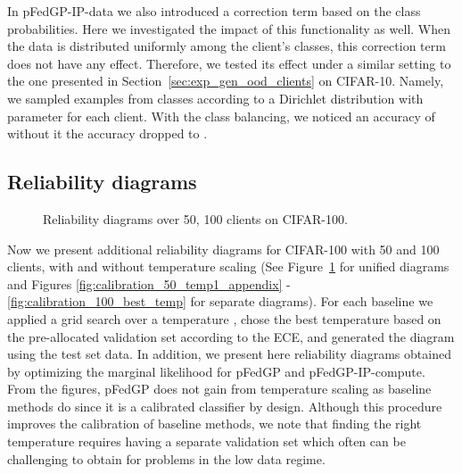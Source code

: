 \documentclass{article}
\def\Figref#1{Figure~\ref{#1}}
\def\Secref#1{Section~\ref{#1}}
\begin{document}
In pFedGP-IP-data we also introduced a correction term based on the class probabilities. Here we investigated the impact of this functionality as well.
When the data is distributed uniformly among the client's classes, this correction term does not have any effect. Therefore, we tested its effect under a similar setting to the one presented in \Secref{sec:exp_gen_ood_clients} on CIFAR-10. Namely, we sampled examples from classes according to a Dirichlet distribution with parameter  for each client. With the class balancing, we noticed an accuracy of  without it the accuracy dropped to .

\subsection{Reliability diagrams} \label{sec:reliability_diad_appendix}
\begin{figure}[!t]
\centering
\tiny
{}
\caption{Reliability diagrams over 50, 100 clients on CIFAR-100.}
\label{fig:calibration_all}
\end{figure}





Now we present additional reliability diagrams for CIFAR-100 with 50 and 100 clients, with and without temperature scaling (See \Figref{fig:calibration_all} for unified diagrams and Figures \ref{fig:calibration_50_temp1_appendix} - \ref{fig:calibration_100_best_temp} for separate diagrams). For each baseline we applied a grid search over a temperature , chose the best temperature based on the pre-allocated validation set according to the ECE, and generated the diagram using the test set data. In addition, we present here reliability diagrams obtained by optimizing the marginal likelihood for pFedGP and pFedGP-IP-compute. From the figures, pFedGP does not gain from temperature scaling as baseline methods do since it is a calibrated classifier by design. Although this procedure improves the calibration of baseline methods, we note that finding the right temperature requires having a separate validation set which often can be challenging to obtain for problems in the low data regime.
\end{document}
